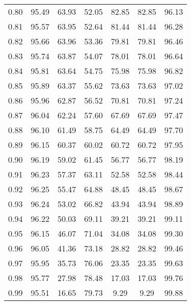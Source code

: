\begin{tabular}{|c|c|c|c|c|c|c|}
      0.80 &     95.49 &     63.93 &      52.05 &   82.85 &      82.85 &         96.13 \\
      0.81 &     95.57 &     63.95 &      52.64 &   81.44 &      81.44 &         96.28 \\
      0.82 &     95.66 &     63.96 &      53.36 &   79.81 &      79.81 &         96.46 \\
      0.83 &     95.74 &     63.87 &      54.07 &   78.01 &      78.01 &         96.64 \\
      0.84 &     95.81 &     63.64 &      54.75 &   75.98 &      75.98 &         96.82 \\
      0.85 &     95.89 &     63.37 &      55.62 &   73.63 &      73.63 &         97.02 \\
      0.86 &     95.96 &     62.87 &      56.52 &   70.81 &      70.81 &         97.24 \\
      0.87 &     96.04 &     62.24 &      57.60 &   67.69 &      67.69 &         97.47 \\
      0.88 &     96.10 &     61.49 &      58.75 &   64.49 &      64.49 &         97.70 \\
      0.89 &     96.15 &     60.37 &      60.02 &   60.72 &      60.72 &         97.95 \\
      0.90 &     96.19 &     59.02 &      61.45 &   56.77 &      56.77 &         98.19 \\
      0.91 &     96.23 &     57.37 &      63.11 &   52.58 &      52.58 &         98.44 \\
      0.92 &     96.25 &     55.47 &      64.88 &   48.45 &      48.45 &         98.67 \\
      0.93 &     96.24 &     53.02 &      66.82 &   43.94 &      43.94 &         98.89 \\
      0.94 &     96.22 &     50.03 &      69.11 &   39.21 &      39.21 &         99.11 \\
      0.95 &     96.15 &     46.07 &      71.04 &   34.08 &      34.08 &         99.30 \\
      0.96 &     96.05 &     41.36 &      73.18 &   28.82 &      28.82 &         99.46 \\
      0.97 &     95.95 &     35.73 &      76.06 &   23.35 &      23.35 &         99.63 \\
      0.98 &     95.77 &     27.98 &      78.48 &   17.03 &      17.03 &         99.76 \\
      0.99 &     95.51 &     16.65 &      79.73 &    9.29 &       9.29 &         99.88 \\
\bottomrule
\end{tabular}
